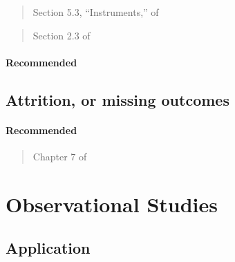 \documentclass[12pt]{article}
\begin{document}
\begin{verse}
  Section 5.3, ``Instruments,'' of  \end{verse}

\begin{verse} Section 2.3 of  \end{verse}

\paragraph*{Recommended}

\begin{verse}  \end{verse}

\begin{verse}  \end{verse}

\begin{verse}  \end{verse}

\subsection{Attrition, or missing outcomes}

\paragraph*{Recommended}

\begin{verse} Chapter 7 of  \end{verse}

\begin{verse}  \end{verse}

\begin{verse}  \end{verse}

\section{Observational Studies}

\subsection*{Application}
\end{document}

